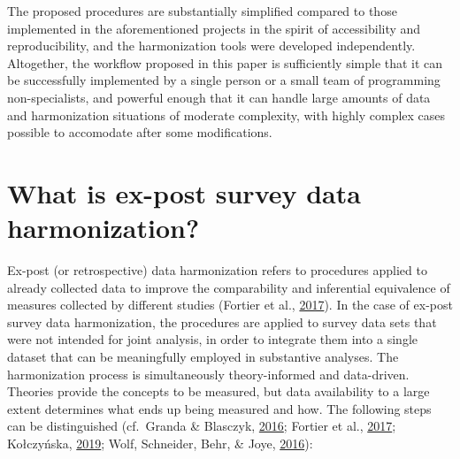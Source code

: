\documentclass[12pt,]{article}
\begin{document}
The proposed procedures are substantially simplified compared to those implemented in the aforementioned projects in the spirit of accessibility and reproducibility, and the harmonization tools were developed independently. Altogether, the workflow proposed in this paper is sufficiently simple that it can be successfully implemented by a single person or a small team of programming non-specialists, and powerful enough that it can handle large amounts of data and harmonization situations of moderate complexity, with highly complex cases possible to accomodate after some modifications.

\hypertarget{what-is-ex-post-survey-data-harmonization}{%
\section{What is ex-post survey data harmonization?}\label{what-is-ex-post-survey-data-harmonization}}

Ex-post (or retrospective) data harmonization refers to procedures applied to already collected data to improve the comparability and inferential equivalence of measures collected by different studies (Fortier et al., \protect\hyperlink{ref-Fortier2017a}{2017}). In the case of ex-post survey data harmonization, the procedures are applied to survey data sets that were not intended for joint analysis, in order to integrate them into a single dataset that can be meaningfully employed in substantive analyses. The harmonization process is simultaneously theory-informed and data-driven. Theories provide the concepts to be measured, but data availability to a large extent determines what ends up being measured and how. The following steps can be distinguished (cf.~Granda \& Blasczyk, \protect\hyperlink{ref-Granda2016}{2016}; Fortier et al., \protect\hyperlink{ref-Fortier2017a}{2017}; Kołczyńska, \protect\hyperlink{ref-Kolczynska2019}{2019}; Wolf, Schneider, Behr, \& Joye, \protect\hyperlink{ref-Wolf2016}{2016}):
\end{document}
